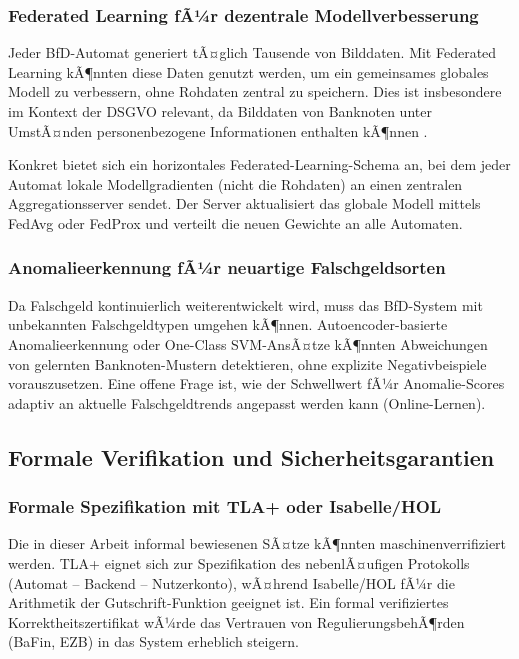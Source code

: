 ﻿\documentclass[a4paper,12pt]{article}
\theoremstyle{definition}
\begin{document}
\subsubsection{Federated Learning fÃ¼r dezentrale Modellverbesserung}

Jeder BfD-Automat generiert tÃ¤glich Tausende von Bilddaten.
Mit Federated Learning kÃ¶nnten diese Daten genutzt werden, um ein
gemeinsames globales Modell zu verbessern, ohne Rohdaten zentral zu speichern.
Dies ist insbesondere im Kontext der DSGVO relevant, da Bilddaten von
Banknoten unter UmstÃ¤nden personenbezogene Informationen enthalten kÃ¶nnen \cite{konecny2016}.

Konkret bietet sich ein horizontales Federated-Learning-Schema an,
bei dem jeder Automat lokale Modellgradienten (nicht die Rohdaten) an
einen zentralen Aggregationsserver sendet.  Der Server aktualisiert das
globale Modell mittels FedAvg oder FedProx \cite{li2020federated} und
verteilt die neuen Gewichte an alle Automaten.

\subsubsection{Anomalieerkennung fÃ¼r neuartige Falschgeldsorten}

Da Falschgeld kontinuierlich weiterentwickelt wird, muss das BfD-System
mit unbekannten Falschgeldtypen umgehen kÃ¶nnen.
Autoencoder-basierte Anomalieerkennung \cite{hinton2006reducing} oder
One-Class SVM-AnsÃ¤tze kÃ¶nnten Abweichungen von gelernten Banknoten-Mustern
detektieren, ohne explizite Negativbeispiele vorauszusetzen.
Eine offene Frage ist, wie der Schwellwert fÃ¼r Anomalie-Scores adaptiv
an aktuelle Falschgeldtrends angepasst werden kann (Online-Lernen).

\subsection{Formale Verifikation und Sicherheitsgarantien}

\subsubsection{Formale Spezifikation mit TLA+ oder Isabelle/HOL}

Die in dieser Arbeit informal bewiesenen SÃ¤tze kÃ¶nnten maschinenverrifiziert
werden.  TLA+ \cite{lamport2002specifying} eignet sich zur Spezifikation des
nebenlÃ¤ufigen Protokolls (Automat -- Backend -- Nutzerkonto), wÃ¤hrend
Isabelle/HOL \cite{nipkow2002isabelle} fÃ¼r die Arithmetik der Gutschrift-Funktion
geeignet ist.  Ein formal verifiziertes Korrektheitszertifikat wÃ¼rde das Vertrauen
von RegulierungsbehÃ¶rden (BaFin, EZB) in das System erheblich steigern.
\end{document}
